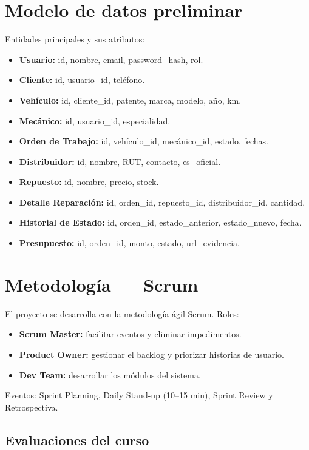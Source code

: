 \documentclass[11pt]{article}
\begin{document}
\section{Modelo de datos preliminar}

Entidades principales y sus atributos:

\begin{itemize}
  \item \textbf{Usuario:} id, nombre, email, password\_hash, rol.
  \item \textbf{Cliente:} id, usuario\_id, teléfono.
  \item \textbf{Vehículo:} id, cliente\_id, patente, marca, modelo, año, km.
  \item \textbf{Mecánico:} id, usuario\_id, especialidad.
  \item \textbf{Orden de Trabajo:} id, vehículo\_id, mecánico\_id, estado, fechas.
  \item \textbf{Distribuidor:} id, nombre, RUT, contacto, es\_oficial.
  \item \textbf{Repuesto:} id, nombre, precio, stock.
  \item \textbf{Detalle Reparación:} id, orden\_id, repuesto\_id, distribuidor\_id, cantidad.
  \item \textbf{Historial de Estado:} id, orden\_id, estado\_anterior, estado\_nuevo, fecha.
  \item \textbf{Presupuesto:} id, orden\_id, monto, estado, url\_evidencia.
\end{itemize}

\section{Metodología — Scrum}

El proyecto se desarrolla con la metodología ágil Scrum. Roles:

\begin{itemize}
  \item \textbf{Scrum Master:} facilitar eventos y eliminar impedimentos.
  \item \textbf{Product Owner:} gestionar el backlog y priorizar historias de usuario.
  \item \textbf{Dev Team:} desarrollar los módulos del sistema.
\end{itemize}

Eventos: Sprint Planning, Daily Stand-up (10–15 min), Sprint Review y Retrospectiva.

\subsection{Evaluaciones del curso}
\end{document}
